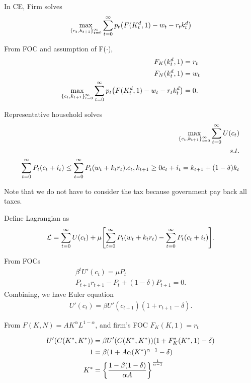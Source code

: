 \documentclass{ltjsarticle}
\begin{document}
In CE, Firm solves
\begin{align*}
    \max_{\{c_t, k_{t+1}\}^{\infty}_{t=0}} \sum^{\infty}_{t=0} p_t\qty(F(K^d_t,1)-w_t -r_tk_t^d)
\end{align*}

From FOC and assumption of F($\cdot$),
\begin{align*}
    F_K(k_t^d,1)&=r_t\\
    F_N(k_t^d,1)&=w_t\\
    \max_{\{c_t, k_{t+1}\}^{\infty}_{t=0}} \sum^{\infty}_{t=0} p_t\qty(F(K^d_t,1)-w_t -r_tk_t^d)&=0.
\end{align*}

Representative household solves
\begin{align*}
    \max_{\qty{c_t,k_{t+1}}^{\infty}_{t=0}} \sum^{\infty}_{t=0} U(c_t)\\
    s.t.\\
    \sum^{\infty}_{t=0} P_t\qty(c_t + i_t) \leq \sum^{\infty}_{t=0} P_t \qty(w_t+k_t r_t).
    c_t, k_{t+1} \geq 0
    c_t + i_t = k_{t+1} + (1-\delta)k_t
\end{align*}

Note that we do not have to consider the tax because government pay back all taxes.

Define Lagrangian as 
$$\mathcal{L}=\sum^{\infty}_{t=0} U(c_t) + \mu\qty[ \sum^{\infty}_{t=0} P_t \qty(w_t+k_t r_t) - \sum^{\infty}_{t=0} P_t\qty(c_t + i_t)].$$

From FOCs
\begin{align*}
    \beta^t U'(c_t)=\mu P_t\\
    P_{t+1}r_{t+1} -P_t + (1-\delta)P_{t+1}=0.
\end{align*}
Combining, we have Euler equation
\begin{align*}
    U'(c_t)=\beta U'(c_{t+1})(1+r_{t+1}-\delta).
\end{align*}

From $F(K,N)=AK^\alpha L^{1-\alpha}$, and firm's FOC $F_K(K,1)=r_t$

\begin{align*}
    U'(C(K^{*},K^{*}))&=\beta U'(C(K^{*},K^{*}))(1+F_K^{*}(K^{*},1)-\delta)\\
    1&=\beta (1+A\alpha (K^{*})^{\alpha-1}-\delta)\\
    K^{*}&=\qty{\frac{1-\beta(1-\delta)}{\alpha A}}^{\frac{1}{\alpha-1}}
\end{align*}

\section{} %
\end{document}
